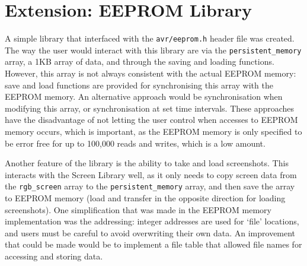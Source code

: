 \documentclass[a4paper,10pt]{article}
\begin{document}
\section*{Extension: EEPROM Library}
A simple library that interfaced with the \texttt{avr/eeprom.h} header file
was created. The way the user would interact with this library are via the
\texttt{persistent\_memory} array, a 1KB array of data, and through the saving
and loading functions. However, this array is not always consistent with the
actual EEPROM memory: save and load functions are provided for synchronising
this array with the EEPROM memory. An alternative approach would be
synchronisation when modifying this array, or synchronisation at set time
intervals. These approaches have the disadvantage of not letting the user
control when accesses to EEPROM memory occurs, which is important, as the
EEPROM memory is only specified to be error free for up to 100,000 reads and
writes, which is a low amount.

Another feature of the library is the ability to take and load screenshots.
This interacts with the Screen Library well, as it only needs to copy screen
data from the \texttt{rgb\_screen} array to the \texttt{persistent\_memory}
array, and then save the array to EEPROM memory (load and transfer in the
opposite direction for loading screenshots).
One simplification that was made in the EEPROM memory implementation was the
addressing: integer addresses are used for `file' locations, and users must
be careful to avoid overwriting their own data. An improvement that could be
made would be to implement a file table that allowed file names for accessing
and storing data.
\end{document}
